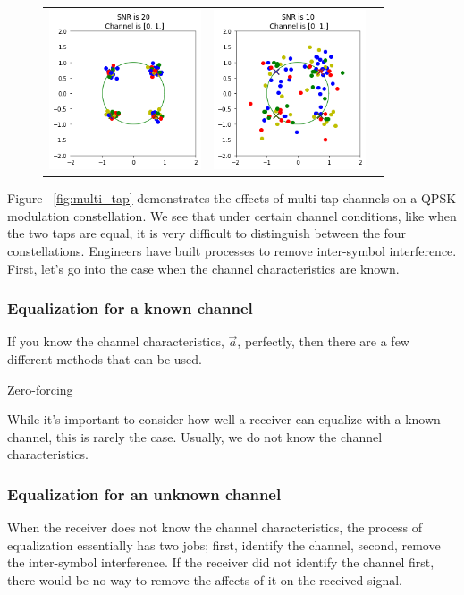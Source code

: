 \begin{figure}
\begin{tabular}{ccc}
    \includegraphics[width=45mm]{figures/equal_intro/snr_20_c5/cfo_0.png}&
    \includegraphics[width=45mm]{figures/equal_intro/snr_10_c5/cfo_0.png}\\
  \end{tabular}
\end{figure}

Figure ~\ref{fig:multi_tap} demonstrates the effects of multi-tap channels on a QPSK modulation constellation.  We see that under certain channel conditions, like when the two taps are equal, it is very difficult to distinguish between the four constellations.  
Engineers have built processes to remove inter-symbol interference.  First, let's go into the case when the channel characteristics are known.

\subsubsection{Equalization for a known channel}

If you know the channel characteristics, $\vec{a}$, perfectly, then there are a few different methods that can be used. 

Zero-forcing

While it's important to consider how well a receiver can equalize with a known channel, this is rarely the case.  Usually, we do not know the channel characteristics.

\subsubsection{Equalization for an unknown channel}
When the receiver does not know the channel characteristics, the process of equalization essentially has two jobs; first, identify the channel, second, remove the inter-symbol interference. If the receiver did not identify the channel first, there would be no way to remove the affects of it on the received signal. 

